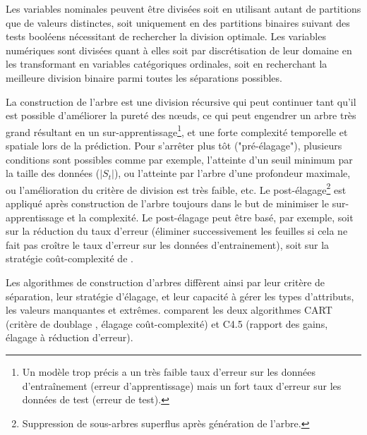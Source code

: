 Les variables nominales peuvent être divisées soit en utilisant autant de partitions que de valeurs distinctes, soit uniquement en des partitions binaires suivant des tests booléens nécessitant de rechercher la division optimale. Les variables numériques sont divisées quant à elles soit par discrétisation de leur domaine en les transformant en variables catégoriques ordinales, soit en recherchant la meilleure division binaire parmi toutes les séparations possibles. 

La construction de l'arbre est une division récursive qui peut continuer tant qu'il est possible d'améliorer la pureté des nœuds, ce qui peut engendrer un arbre très grand résultant en un sur-apprentissage\footnote{Un modèle trop précis a un très faible taux d'erreur sur les données d'entraînement (erreur d'apprentissage) mais un fort taux d'erreur sur les données de test (erreur de test).}, et une forte complexité temporelle et spatiale lors de la prédiction. Pour s'arrêter plus tôt ("pré-élagage"), plusieurs conditions sont possibles comme par exemple, l'atteinte d'un seuil minimum par la taille des données ($\vert S_t \vert$), ou l'atteinte par l'arbre d'une profondeur maximale, ou l'amélioration du critère de division est très faible, etc. Le post-élagage\footnote{Suppression de sous-arbres superflus après génération de l'arbre.} est appliqué après construction de l'arbre toujours dans le but de minimiser le sur-apprentissage et la complexité. Le post-élagage peut être basé, par exemple, soit sur la réduction du taux d'erreur (éliminer successivement les feuilles si cela ne fait pas croître le taux d'erreur sur les données d'entrainement), soit sur la stratégie coût-complexité de \citet{Breiman1984CART}. %

Les algorithmes de construction d'arbres diffèrent ainsi par leur critère de séparation, leur stratégie d'élagage, et leur capacité à gérer les types d'attributs, les valeurs manquantes et extrêmes. \citet{singh2014id3cartc45} comparent les deux algorithmes CART \citep{Breiman1984CART} (critère de \og doublage \fg{}, élagage coût-complexité) et C4.5 \citep{quinlan1993c4.5} (rapport des gains, élagage à réduction d'erreur).

